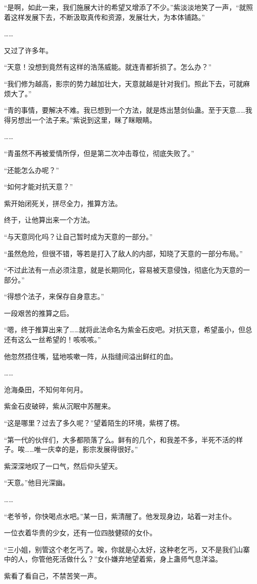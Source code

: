 \begin{this_body}
“是啊，如此一来，我们施展大计的希望又增添了不少。”紫淡淡地笑了一声，“就照着这样发展下去，不断汲取真传和资源，发展壮大，为本体铺路。”

……

又过了许多年。

“天意！没想到竟然有这样的浩荡威能。就连青都折损了。怎么办？”

“我们修为越高，影宗的势力越加壮大，天意就越是针对我们。照此下去，可就麻烦大了。”

“青的事情，要解决不难。我已想到一个方法，就是炼出慧剑仙蛊。至于天意……我得另想出一个法子来。”紫说到这里，眯了眯眼睛。

……

“青虽然不再被爱情所俘，但是第二次冲击尊位，彻底失败了。”

“还能怎么办呢？”

“如何才能对抗天意？”

紫开始闭死关，拼尽全力，推算方法。

终于，让他算出来一个方法。

“与天意同化吗？让自己暂时成为天意的一部分。”

“虽然危险，但很不错，等若是打入了敌人的内部，知晓了天意的一部分布局。”

“不过此法有一点必须注意，就是长期同化，容易被天意侵蚀，彻底化为天意的一部分。”

“得想个法子，来保存自身意志。”

一段艰苦的推算之后。

“嗯，终于推算出来了……就将此法命名为紫金石皮吧。对抗天意，希望虽小，但总还有这么一丝希望的！咳咳咳。”

他忽然捂住嘴，猛地咳嗽一阵，从指缝间溢出鲜红的血。

……

沧海桑田，不知何年何月。

紫金石皮破碎，紫从沉眠中苏醒来。

“这是哪里？过去了多久呢？”望着陌生的环境，紫楞了楞。

“第一代的伙伴们，大多都陨落了么。鲜有的几个，和我差不多，半死不活的样子。唉……唯一庆幸的是，影宗发展得很好。”

紫深深地叹了一口气，然后仰头望天。

“天意。”他目光深幽。

……

“老爷爷，你快喝点水吧。”某一日，紫清醒了。他发现身边，站着一对主仆。

一位衣着华贵的少女，还有一位四肢健硕的女仆。

“三小姐，别管这个老乞丐了。唉，你就是心太好，这种老乞丐，又不是我们山寨中的人，你管他死活做什么？”女仆嫌弃地望着紫，身上蛊师气息洋溢。

紫看了看自己，不禁苦笑一声。

\end{this_body}

